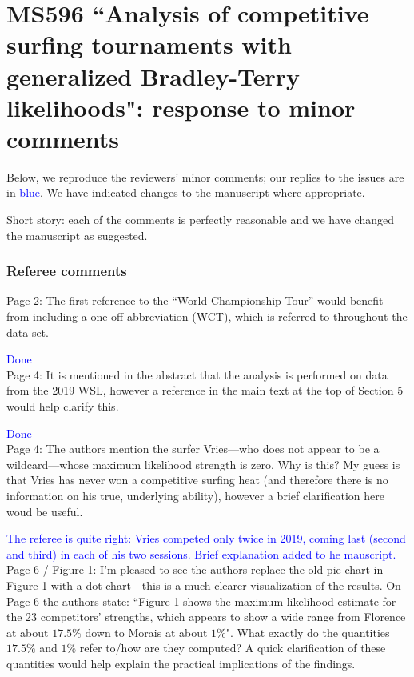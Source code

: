 \documentclass[12pt]{article}
\begin{document}
\section*{MS596 ``Analysis of competitive surfing tournaments with generalized Bradley-Terry likelihoods": response to minor comments}

Below, we reproduce the reviewers' minor comments; our replies to
the issues are in \textcolor{blue}{blue}.  We have indicated changes
to the manuscript where appropriate.

Short story: each of the  comments is perfectly reasonable and we have 
changed the manuscript as suggested.


\subsubsection*{Referee comments}

Page 2: The first reference to the ``World Championship Tour'' would
benefit from including a one-off abbreviation (WCT), which is referred
to throughout the data set.

\textcolor{blue}{Done}\\

Page 4: It is mentioned in the abstract that the analysis is performed
on data from the 2019 WSL, however a reference in the main text at the
top of Section 5 would help clarify this.

\textcolor{blue}{Done}\\


Page 4: The authors mention the surfer Vries---who does not appear to
be a wildcard---whose maximum likelihood strength is zero. Why is
this? My guess is that Vries has never won a competitive surfing heat
(and therefore there is no information on his true, underlying
ability), however a brief clarification here woud be useful.

\textcolor{blue}{The referee is quite right: Vries competed only twice
  in 2019, coming last (second and third) in each of his two sessions.
  Brief explanation added to he mauscript.}\\


Page 6 / Figure 1: I'm pleased to see the authors replace the old pie
chart in Figure 1 with a dot chart---this is a much clearer
visualization of the results.  On Page 6 the authors state: ``Figure 1
shows the maximum likelihood estimate for the 23 competitors'
strengths, which appears to show a wide range from Florence at about
$17.5\%$ down to Morais at about $1\%$". What exactly do the
quantities $17.5\%$ and $1\%$ refer to/how are they computed? A quick
clarification of these quantities would help explain the practical
implications of the findings.
\end{document}
